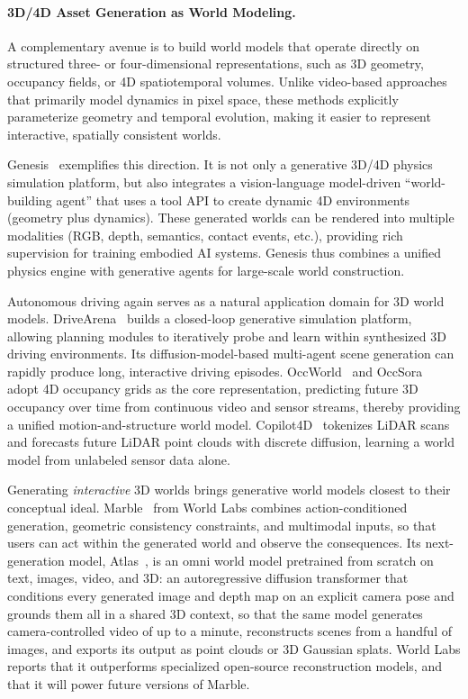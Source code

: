 \paragraph{3D/4D Asset Generation as World Modeling.}
A complementary avenue is to build world models that operate directly on structured three- or four-dimensional representations, such as 3D geometry, occupancy fields, or 4D spatiotemporal volumes.
Unlike video-based approaches that primarily model dynamics in pixel space, these methods explicitly parameterize geometry and temporal evolution, making it easier to represent interactive, spatially consistent worlds.


Genesis~\cite{Genesis} exemplifies this direction. It is not only a generative 3D/4D physics simulation platform, but also integrates a vision-language model-driven ``world-building agent'' that uses a tool API to create dynamic 4D environments (geometry plus dynamics).
These generated worlds can be rendered into multiple modalities (RGB, depth, semantics, contact events, etc.), providing rich supervision for training embodied AI systems.
Genesis thus combines a unified physics engine with generative agents for large-scale world construction.


Autonomous driving again serves as a natural application domain for 3D world models.
DriveArena~\cite{yang2025drivearena} builds a closed-loop generative simulation platform, allowing planning modules to iteratively probe and learn within synthesized 3D driving environments.
Its diffusion-model-based multi-agent scene generation can rapidly produce long, interactive driving episodes.
OccWorld~\cite{zheng2024occworld} and OccSora~\cite{wang2024occsora} adopt 4D occupancy grids as the core representation, predicting future 3D occupancy over time from continuous video and sensor streams, thereby providing a unified motion-and-structure world model.
Copilot4D~\cite{zhang2023copilot4d} tokenizes LiDAR scans and forecasts future LiDAR point clouds with discrete diffusion, learning a world model from unlabeled sensor data alone.


Generating \emph{interactive} 3D worlds brings generative world models closest to their conceptual ideal.
Marble~\cite{Feifei2025Marble} from World Labs combines action-conditioned generation, geometric consistency constraints, and multimodal inputs, so that users can act within the generated world and observe the consequences.
Its next-generation model, Atlas~\cite{worldlabs2026atlas}, is an omni world model pretrained from scratch on text, images, video, and 3D: an autoregressive diffusion transformer that conditions every generated image and depth map on an explicit camera pose and grounds them all in a shared 3D context, so that the same model generates camera-controlled video of up to a minute, reconstructs scenes from a handful of images, and exports its output as point clouds or 3D Gaussian splats. World Labs reports that it outperforms specialized open-source reconstruction models, and that it will power future versions of Marble.


